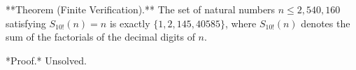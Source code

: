 
**Theorem (Finite Verification).** The set of natural numbers $n \leq 2{,}540{,}160$ satisfying $S_{10!}(n) = n$ is exactly $\{1, 2, 145, 40585\}$, where $S_{10!}(n)$ denotes the sum of the factorials of the decimal digits of $n$.

*Proof.* Unsolved.